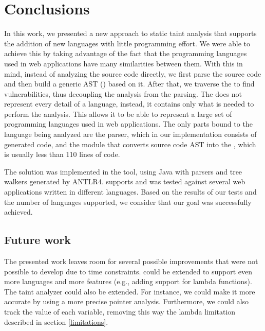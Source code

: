 
\chapter{Conclusions}
\label{chapter:conclusions}
In this work, we presented a new approach to static taint analysis that supports the addition of new languages with little programming effort. We were able to achieve this by taking advantage of the fact that the programming languages used in web applications have many similarities between them. With this in mind, instead of analyzing the source code directly, we first parse the source code and then build a generic AST (\astname{}) based on it. After that, we traverse the \astname{} to find vulnerabilities, thus decoupling the analysis from the parsing. The \astname{} does not represent every detail of a language, instead, it contains only what is needed to perform the analysis. This allows it to be able to represent a large set of programming languages used in web applications. The only parts bound to the language being analyzed are the parser, which in our implementation consists of generated code, and the module that converts source code AST into the \astname{}, which is usually less than 110 lines of code. 

The solution was implemented in the \toolname{} tool, using Java with parsers and tree walkers generated by ANTLR4. \toolname{} supports \implangs{} and was tested against several web applications written in different languages. Based on the results of our tests and the number of languages supported, we consider that our goal was successfully achieved.


\section{Future work}

The presented work leaves room for several possible improvements that were not possible to develop due to time constraints. \astname{} could be extended to support even more languages and more features (e.g., adding support for lambda functions). The taint analyzer could also be extended. For instance, we could make it more accurate by using a more precise pointer analysis. Furthermore, we could also track the value of each variable, removing this way the lambda limitation described in section \ref{limitations}. 